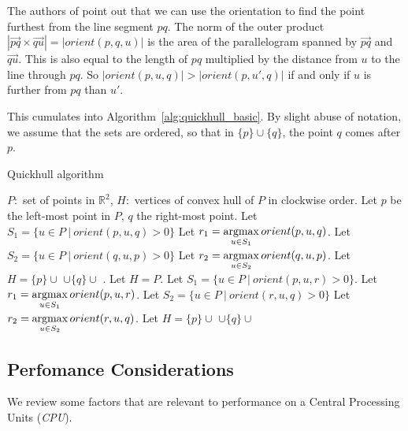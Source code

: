 The authors of \cite{quickerthanqhull} point out that we can use the 
orientation to find the point furthest from the line segment $pq$. 
The norm of the outer product
$|\vec{pq} \times \vec{qu}| = |orient(p, q, u)|$ is the area of the
parallelogram spanned by $\vec{pq}$ and $\vec{qu}$. This is also equal to
the length of $pq$ multiplied by the distance from $u$ to the line through 
$pq$. So $|orient(p, u, q)| > |orient(p, u', q)|$ if and only if $u$ is further
from $pq$ than $u'$.

This cumulates into Algorithm~\ref{alg:quickhull_basic}. By slight abuse
of notation, we assume that the sets are ordered, so that in $\{p\} \cup \{q\}$,
the point $q$ comes after $p$.

\begin{algorithm}[ht]
\begin{algorithmic}[1]
    \caption{Quickhull algorithm}\label{alg:quickhull_basic}
    \Require $P: $ set of points in $\mathbb{R}^2$,
    \Ensure $H: $ vertices of convex hull of $P$ in clockwise order.
    \State Let $p$ be the left-most point in $P$, $q$ the right-most point.
    \State Let $S_1 = \{u \in P \ | \ orient(p, u, q) > 0\}$
    \State Let $r_1 = \operatorname*{argmax}\limits_{u \in S_1}orient(p, u, q)$.
    \State Let $S_2 = \{u \in P \ | \ orient(q, u, p) > 0\}$
    \State Let $r_2 = \operatorname*{argmax}\limits_{u \in S_2}orient(q, u, p)$.
    \State Let $H = \{p\} \cup $ 
            $\cup \{q\} \cup$ .
            \State Let $H = P$.
        \Else
            \State Let $S_1 = \{u \in P \ | \ orient(p, u, r) > 0\}$.
            \State Let $r_1 = \operatorname*{argmax}\limits_{u \in S_1}orient(p, u, r)$.
            \State Let $S_2 = \{u \in P \ | \ orient(r, u, q) > 0\}$
            \State Let $r_2 = \operatorname*{argmax}\limits_{u \in S_2}orient(r, u, q)$.
            \State Let $H = \{p\} \cup $ 
                   $\cup \{q\} \cup$ 
        \EndIf
    \EndFunction
\end{algorithmic}
\end{algorithm}


\subsection{Perfomance Considerations}

We review some factors that are relevant to performance on a Central Processing
Units (\textit{CPU}).

